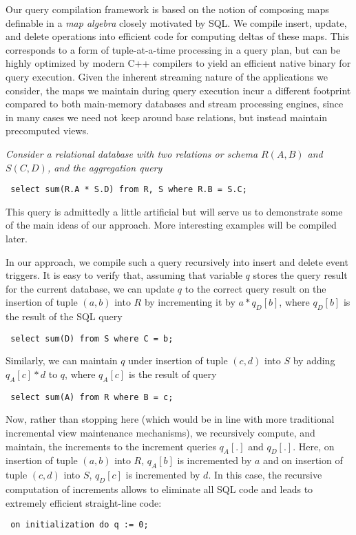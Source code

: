 Our query compilation framework is based on the notion of composing maps
definable in a {\em map algebra}\/ closely motivated by SQL.  We compile insert,
update, and delete operations into efficient code for computing deltas of these
maps. This corresponds to a form of tuple-at-a-time processing in a query plan,
but can be highly optimized by modern C++ compilers to yield an efficient native
binary for query execution.  Given the inherent streaming nature of the
applications we consider, the maps we maintain during query execution incur a
different footprint compared to both main-memory databases and stream processing
engines, since in many cases we need not keep around base relations, but instead
maintain precomputed views.



\begin{example}\em Consider a relational database with two relations or schema
$R(A,B)$ and $S(C,D)$, and the aggregation query
\begin{verbatim} select sum(R.A * S.D) from R, S where R.B = S.C;
\end{verbatim} This query is admittedly a little artificial but will serve us to
demonstrate some of the main ideas of our approach. More interesting examples
will be compiled later.

In our approach, we compile such a query recursively into insert and delete
event triggers.  It is easy to verify that, assuming that variable $q$ stores
the query result for the current database, we can update $q$ to the correct
query result on the insertion of tuple $(a,b)$ into $R$ by incrementing it by $a
* q_D[b]$, where $q_D[b]$ is the result of the SQL query
\begin{verbatim} select sum(D) from S where C = b;
\end{verbatim} Similarly, we can maintain $q$ under insertion of tuple $(c,d)$
into $S$ by adding $q_A[c] * d$ to $q$, where $q_A[c]$ is the result of query
\begin{verbatim} select sum(A) from R where B = c;
\end{verbatim} Now, rather than stopping here (which would be in line with more
traditional incremental view maintenance mechanisms), we recursively compute,
and maintain, the increments to the increment queries $q_A[.]$ and $q_D[.]$.
Here, on insertion of tuple $(a,b)$ into $R$, $q_A[b]$ is incremented by $a$ and
on insertion of tuple $(c,d)$ into $S$, $q_D[c]$ is incremented by $d$.  In this
case, the recursive computation of increments allows to eliminate all SQL code
and leads to extremely efficient straight-line code:
\begin{verbatim} on initialization do q := 0;


\end{verbatim}
\end{example}
